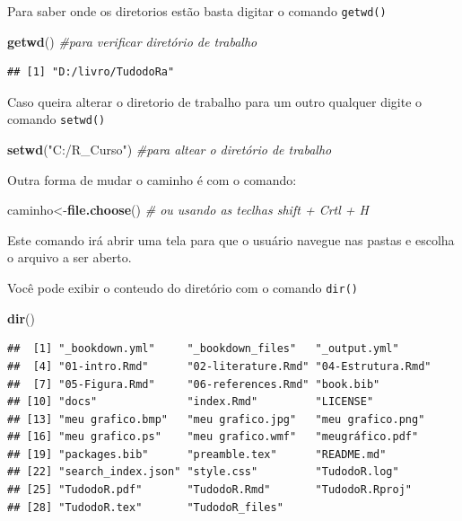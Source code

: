 \documentclass[]{book}
\newenvironment{Shaded}{\begin{snugshade}}{\end{snugshade}}
\newcommand{\CommentTok}[1]{\textcolor[rgb]{0.56,0.35,0.01}{\textit{#1}}}
\newcommand{\KeywordTok}[1]{\textcolor[rgb]{0.13,0.29,0.53}{\textbf{#1}}}
\newcommand{\NormalTok}[1]{#1}
\newcommand{\StringTok}[1]{\textcolor[rgb]{0.31,0.60,0.02}{#1}}
\begin{document}
Para saber onde os diretorios estão basta digitar o comando \texttt{getwd()}

\begin{Shaded}
\begin{Highlighting}[]
 \KeywordTok{getwd}\NormalTok{() }\CommentTok{#para verificar  diretório de trabalho}
\end{Highlighting}
\end{Shaded}

\begin{verbatim}
## [1] "D:/livro/TudodoRa"
\end{verbatim}

Caso queira alterar o diretorio de trabalho para um outro qualquer digite o comando \texttt{setwd()}

\begin{Shaded}
\begin{Highlighting}[]
\KeywordTok{setwd}\NormalTok{(}\StringTok{"C:/R_Curso"}\NormalTok{) }\CommentTok{#para  altear o diretório de trabalho}
\end{Highlighting}
\end{Shaded}

Outra forma de mudar o caminho é com o comando:

\begin{Shaded}
\begin{Highlighting}[]
\NormalTok{caminho<-}\KeywordTok{file.choose}\NormalTok{() }\CommentTok{# ou usando as teclhas shift + Crtl + H}
\end{Highlighting}
\end{Shaded}

Este comando irá abrir uma tela para que o usuário navegue nas pastas e escolha o arquivo a ser aberto.

Você pode exibir o conteudo do diretório com o comando \texttt{dir()}

\begin{Shaded}
\begin{Highlighting}[]
\KeywordTok{dir}\NormalTok{()}
\end{Highlighting}
\end{Shaded}

\begin{verbatim}
##  [1] "_bookdown.yml"     "_bookdown_files"   "_output.yml"      
##  [4] "01-intro.Rmd"      "02-literature.Rmd" "04-Estrutura.Rmd" 
##  [7] "05-Figura.Rmd"     "06-references.Rmd" "book.bib"         
## [10] "docs"              "index.Rmd"         "LICENSE"          
## [13] "meu grafico.bmp"   "meu grafico.jpg"   "meu grafico.png"  
## [16] "meu grafico.ps"    "meu grafico.wmf"   "meugráfico.pdf"   
## [19] "packages.bib"      "preamble.tex"      "README.md"        
## [22] "search_index.json" "style.css"         "TudodoR.log"      
## [25] "TudodoR.pdf"       "TudodoR.Rmd"       "TudodoR.Rproj"    
## [28] "TudodoR.tex"       "TudodoR_files"
\end{verbatim}
\end{document}
